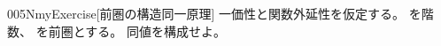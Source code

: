 \documentclass[index]{subfiles}
\begin{document}
\begin{myBlock}{005N}{myExercise}[前圏の構造同一原理]
  一価性と関数外延性を仮定する。
  を階数、
  を前圏とする。
  同値を構成せよ。
\end{myBlock}
\end{document}
